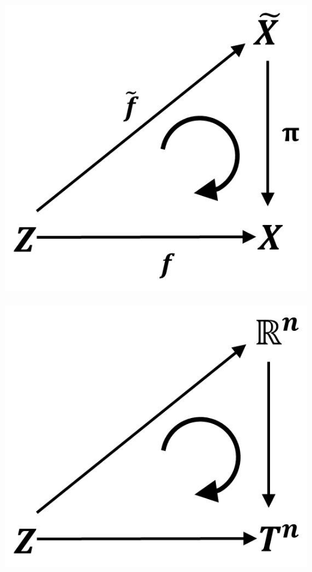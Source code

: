 \documentclass[a4paper,11pt,notitlepage]{report}
\theoremstyle{definition}
\begin{document}
\includegraphics[scale=0.4]{images/Lift_Abbildung.jpg} $\qquad$
\includegraphics[scale=0.4]{images/Lift_Abbildung_Torus.jpg}
\end{document}
